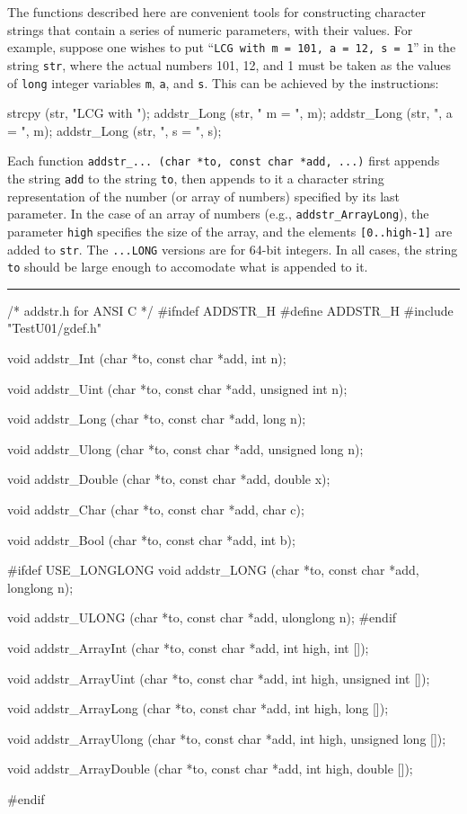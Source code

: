 
The functions described here are convenient tools for constructing
character strings that contain a series of numeric parameters, 
with their values.
For example, suppose one wishes to put 
``{\tt LCG with m = 101, a = 12, s = 1}'' in the string {\tt str}, 
where the actual 
numbers 101, 12, and 1 must be taken as the values of {\tt long}
integer variables {\tt m}, {\tt a}, and {\tt s}.  
This can be achieved by the instructions:
\vcode

   strcpy (str, "LCG with ");
   addstr\_Long (str, " m = ", m);
   addstr\_Long (str, ", a = ", m);
   addstr\_Long (str, ", s = ", s);
\endvcode

Each function {\tt addstr\_... (char *to, const char *add, ...)}
first appends the string {\tt add} to the string {\tt to}, then
appends to it a character string representation of the number 
(or array of numbers) specified by its last parameter.
In the case of an array of numbers (e.g., {\tt addstr\_ArrayLong}),
the parameter {\tt high} specifies the size of the array, and the
elements {\tt [0..high-1]} are added to {\tt str}.
The {\tt ...LONG} versions are for 64-bit integers.
In all cases, the string {\tt to} should be large enough to accomodate
what is appended to it.


\bigskip\hrule
\code\hide
/*  addstr.h  for ANSI C  */
#ifndef ADDSTR_H
#define ADDSTR_H
\endhide
#include "TestU01/gdef.h"
\endcode

\code

void  addstr_Int (char *to, const char *add, int n);

void  addstr_Uint (char *to, const char *add, unsigned int n);

void  addstr_Long (char *to, const char *add, long n);

void  addstr_Ulong (char *to, const char *add, unsigned long n);

void  addstr_Double (char *to, const char *add, double x);

void  addstr_Char (char *to, const char *add, char c);

void  addstr_Bool (char *to, const char *add, int b);
\endcode
\code

#ifdef USE_LONGLONG
void  addstr_LONG (char *to, const char *add, longlong n);

void  addstr_ULONG (char *to, const char *add, ulonglong n);
#endif
\endcode
\code

void  addstr_ArrayInt (char *to, const char *add, int high, int []);

void  addstr_ArrayUint (char *to, const char *add, int high,
                        unsigned int []);

void  addstr_ArrayLong (char *to, const char *add, int high, long []);

void  addstr_ArrayUlong (char *to, const char *add, int high,
                         unsigned long []);

void  addstr_ArrayDouble (char *to, const char *add, int high, double []);

\hide
#endif
\endhide
\endcode

